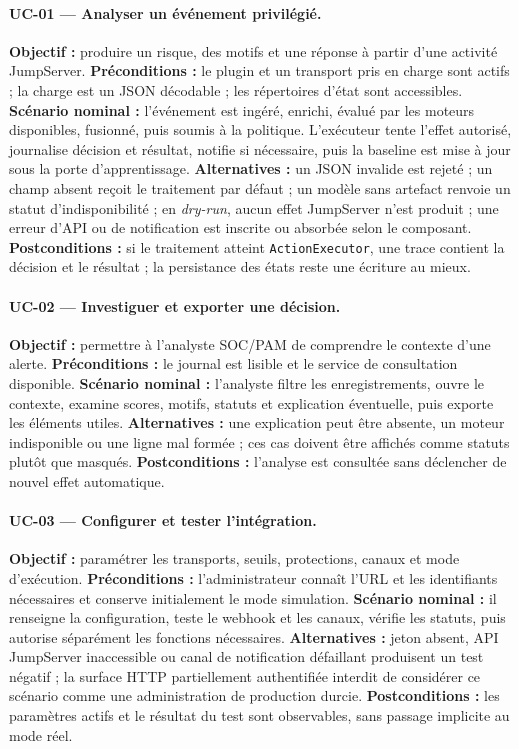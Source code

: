\documentclass[11pt,a4paper,oneside]{report}
\theoremstyle{definition}
\theoremstyle{plain}
\begin{document}
\paragraph{UC-01 --- Analyser un événement privilégié.}
\textbf{Objectif :} produire un risque, des motifs et une réponse à partir
d'une activité JumpServer. \textbf{Préconditions :} le plugin et un transport
pris en charge sont actifs ; la charge est un JSON décodable ; les répertoires
d'état sont accessibles. \textbf{Scénario nominal :} l'événement est ingéré,
enrichi, évalué par les moteurs disponibles, fusionné, puis soumis à la
politique. L'exécuteur tente l'effet autorisé, journalise décision et résultat,
notifie si nécessaire, puis la baseline est mise à jour sous la porte
d'apprentissage. \textbf{Alternatives :} un JSON invalide est rejeté ; un
champ absent reçoit le traitement par défaut ; un modèle sans artefact renvoie
un statut d'indisponibilité ; en \emph{dry-run}, aucun effet JumpServer n'est
produit ; une erreur d'API ou de notification est inscrite ou absorbée selon
le composant. \textbf{Postconditions :} si le traitement atteint
\texttt{ActionExecutor}, une trace contient la décision et le résultat ; la
persistance des états reste une écriture au mieux.

\paragraph{UC-02 --- Investiguer et exporter une décision.}
\textbf{Objectif :} permettre à l'analyste SOC/PAM de comprendre le contexte
d'une alerte. \textbf{Préconditions :} le journal est lisible et le service de
consultation disponible. \textbf{Scénario nominal :} l'analyste filtre les
enregistrements, ouvre le contexte, examine scores, motifs, statuts et
explication éventuelle, puis exporte les éléments utiles.
\textbf{Alternatives :} une explication peut être absente, un moteur
indisponible ou une ligne mal formée ; ces cas doivent être affichés comme
statuts plutôt que masqués. \textbf{Postconditions :} l'analyse est consultée
sans déclencher de nouvel effet automatique.

\paragraph{UC-03 --- Configurer et tester l'intégration.}
\textbf{Objectif :} paramétrer les transports, seuils, protections, canaux et
mode d'exécution. \textbf{Préconditions :} l'administrateur connaît l'URL et
les identifiants nécessaires et conserve initialement le mode simulation.
\textbf{Scénario nominal :} il renseigne la configuration, teste le webhook et
les canaux, vérifie les statuts, puis autorise séparément les fonctions
nécessaires. \textbf{Alternatives :} jeton absent, API JumpServer inaccessible
ou canal de notification défaillant produisent un test négatif ; la surface
HTTP partiellement authentifiée interdit de considérer ce scénario comme une
administration de production durcie. \textbf{Postconditions :} les paramètres
actifs et le résultat du test sont observables, sans passage implicite au mode
réel.
\end{document}
